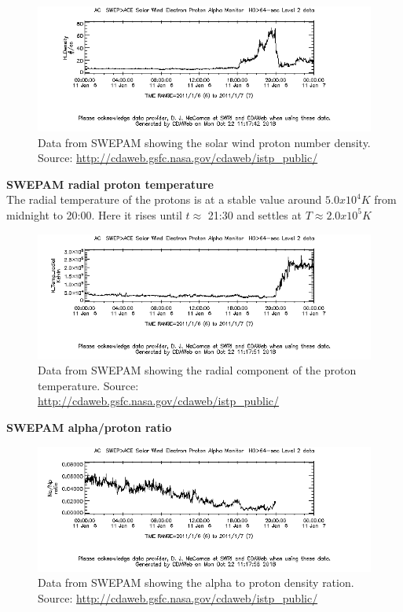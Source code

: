 \documentclass[norsk,a4paper,11pt]{article}
\begin{document}
\begin{multicols}{2}
\begin{figure}[H]
	\includegraphics[scale=0.4]{Figures/ACE_H_Density.png}
	\centering
	\caption{Data from SWEPAM showing the solar wind proton number density. Source: \url{http://cdaweb.gsfc.nasa.gov/cdaweb/istp_public/}}
	\label{fig:ACE_H_Density}
\end{figure}


\textbf{SWEPAM radial proton temperature}\\
The radial temperature of the protons is at a stable value around $5.0x10^4 K$ from midnight to 20:00. Here it rises until $t \approx$ 21:30 and settles at $T \approx 2.0x10^5 K$
\\

\begin{figure}[H]
	\includegraphics[scale=0.4]{Figures/ACE_H_Temp_radial.png}
	\centering
	\caption{Data from SWEPAM showing the radial component of the proton temperature. Source: \url{http://cdaweb.gsfc.nasa.gov/cdaweb/istp_public/}}
	\label{fig:ACE_temp}
\end{figure}



\textbf{SWEPAM alpha/proton ratio}\\

\begin{figure}[H]
	\includegraphics[scale=0.4]{Figures/ACE_Na_Np.png}
	\centering
	\caption{Data from SWEPAM showing the alpha to proton density ration. Source: \url{http://cdaweb.gsfc.nasa.gov/cdaweb/istp_public/}}
	\label{fig:ACE_na_np}
\end{figure}


\end{multicols}
\end{document}
